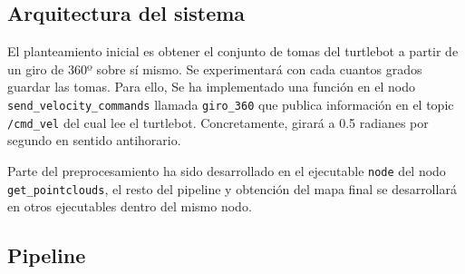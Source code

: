 \documentclass[11pt,letterpaper, onecolumn]{article}
\begin{document}
\subsection{Arquitectura del sistema}

El planteamiento inicial es obtener el conjunto de tomas del turtlebot a partir de un giro de 360º sobre sí mismo. Se experimentará con cada cuantos grados guardar las tomas. Para ello, Se ha implementado una función en el nodo \texttt{send\_velocity\_commands} llamada \texttt{giro\_360} que publica información en el topic \texttt{/cmd\_vel} del cual lee el turtlebot. Concretamente, girará a 0.5 radianes por segundo en sentido antihorario. 

Parte del preprocesamiento ha sido desarrollado en el ejecutable \texttt{node} del nodo \texttt{get\_pointclouds}, el resto del pipeline y obtención del mapa final se desarrollará en otros ejecutables dentro del mismo nodo.

\subsection{Pipeline}
\end{document}
